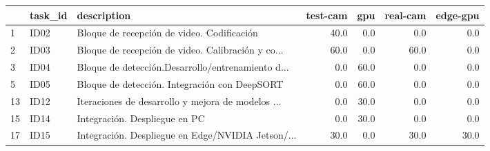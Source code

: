 \begin{tabular}{lllrrrr}
\toprule
{} & task\_id &                                        description &  test-cam &   gpu &  real-cam &  edge-gpu \\
\midrule
1  &    ID02 &         Bloque de recepción de video. Codificación &      40.0 &   0.0 &       0.0 &       0.0 \\
2  &    ID03 &  Bloque de recepción de video. Calibración y co... &      60.0 &   0.0 &      60.0 &       0.0 \\
3  &    ID04 &  Bloque de detección.Desarrollo/entrenamiento d... &       0.0 &  60.0 &       0.0 &       0.0 \\
5  &    ID05 &      Bloque de detección. Integración con DeepSORT &       0.0 &  60.0 &       0.0 &       0.0 \\
13 &    ID12 &  Iteraciones de desarrollo y mejora de modelos ... &       0.0 &  30.0 &       0.0 &       0.0 \\
15 &    ID14 &                      Integración. Despliegue en PC &       0.0 &  30.0 &       0.0 &       0.0 \\
17 &    ID15 &  Integración. Despliegue en Edge/NVIDIA Jetson/... &      30.0 &   0.0 &      30.0 &      30.0 \\
\bottomrule
\end{tabular}
